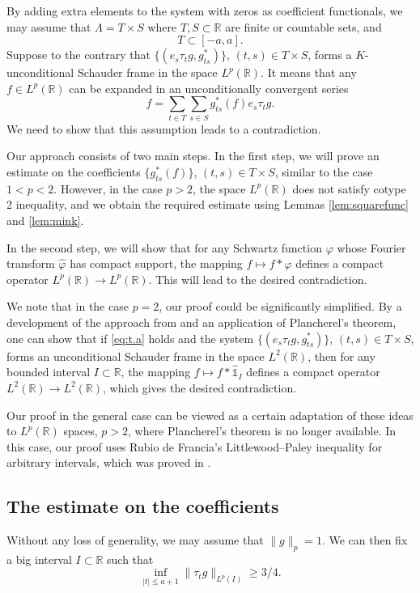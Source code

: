 \documentclass[reqno,a4paper,12pt]{amsart}
\numberwithin{equation}{section}
\numberwithin{figure}{section}
\newcommand\R{\mathbb{R}}
\newcommand\1{\mathds{1}}
\newcommand{\pphi}{\varphi}
\newcommand{\TTT}{T}
\newcommand{\SSS}{S}
\newcommand{\ts}{\tau}
\renewcommand\le{\leqslant}
\renewcommand\ge{\geqslant}
\newcommand\sbt{\subset}
\newcommand{\ft}[1]{\widehat{#1}}
\theoremstyle{plain}
\theoremstyle{definition}
\begin{document}
By adding extra elements to the system with zeros as coefficient functionals,
we may assume that $\Lambda = \TTT \times \SSS$ 
where $\TTT, \SSS \sbt \R$ are finite or countable sets, and 
\begin{equation}
\label{eq:t.a}
\TTT\subset [-a,a].
\end{equation}
 Suppose to the contrary that 
$\{(e_s \ts_t g, g_{ts}^*)\}$, $(t,s) \in  \TTT \times \SSS$, forms
a $K$-unconditional Schauder frame in the space $L^p(\R)$. It means that any $f\in L^p(\R)$
can be expanded in an unconditionally convergent series 
\begin{equation}
\label{eq:expansion_p>2}
f = \sum_{t\in \TTT} \sum_{s\in \SSS} g_{ts}^*(f) e_s \ts_t g.
\end{equation}
We need to show that this assumption leads to a contradiction.

Our approach consists of two main steps. In the first step,
 we will prove an estimate on the coefficients $\{g_{ts}^*(f)\}$,
 $(t,s) \in \TTT \times \SSS$,
similar to the case $1 < p < 2$. However, in the case
 $p > 2$, the space $L^p(\R)$ does not satisfy cotype 2 inequality,
and we obtain the required estimate using
Lemmas \ref{lem:squarefunc} and \ref{lem:mink}.

In the second step, we will show that for any Schwartz function 
$\pphi$ whose Fourier transform $\ft{\pphi}$ has compact
support, the mapping $f\mapsto f\ast\pphi$ defines a 
compact operator   $L^p(\R) \to L^p(\R)$. 
This will lead  to the desired contradiction.

We note that in the case $p=2$,
our proof could be significantly simplified. 
By a development of the approach from \cite{LT25a} 
and an application of Plancherel's theorem, one can show
that if \eqref{eq:t.a} holds and the system
$\{(e_s \ts_t g, g_{ts}^*)\}$, $(t,s) \in  \TTT \times \SSS$, forms
an unconditional Schauder frame in the space $L^2(\R)$,
then for any bounded interval $I \sbt \R$,
the mapping $f \mapsto f \ast \ft{\1}_I$ 
defines a compact operator $L^2(\R) \to L^2(\R)$, 
which gives the desired contradiction.

Our proof in the general case can be viewed as a certain 
adaptation of these ideas to $L^p(\R)$ spaces, $p > 2$,
where Plancherel's theorem is no longer available.
In this case, our proof uses Rubio de Francia's Littlewood--Paley inequality
for arbitrary intervals, which was proved in  \cite{Rub85}.


\subsection{The estimate on the coefficients}
Without any loss of generality, we may assume that $\|g\|_p = 1$. 
We can then fix a big interval $I\subset \R$ such that
\begin{equation}
\label{eq:interval}
\inf_{|t| \le a + 1} \| \ts_t g\|_{L^p(I)} \ge 3/4.
\end{equation}
\end{document}
